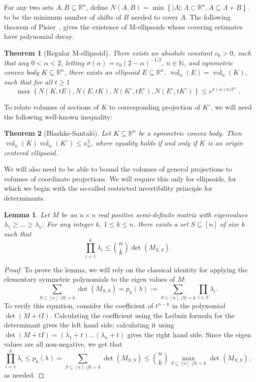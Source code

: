 \documentclass{article}
\newtheorem{theorem}{Theorem}
\newtheorem{lemma}{Lemma}
\newcommand{\R}{{\mathbb{R}}}
\newcommand{\N}{{\mathbb{N}}}
\newcommand{\set}[1]{\left\{ #1 \right\}}
\DeclareMathOperator{\vol}{vol}
\begin{document}
For any two sets $A,B \subseteq \R^n$, define $N(A,B) = \min \set{|\Lambda|:
\Lambda \subset \R^n, A \subseteq \Lambda+B}$.  to be the minimum number of
shifts of $B$ needed to cover $A$. The following theorem of
Pisier~\cite{Pisier-book}, gives the existence of M-ellipsoids whose covering
estimates have polynomial decay. 

\begin{theorem}[Regular M-ellipsoid]
There exists an absolute constant $c_0 > 0$, such that any $0 < \alpha < 2$,
letting $\sigma(\alpha) = c_0(2-\alpha)^{-1/2}$, $n \in \N$, and symmetric
convex body $K \subseteq \R^n$, there exists an ellipsoid $E \subseteq \R^n$,
$\vol_n(E)=\vol_n(K)$, such that for all $t \geq 1$
\[
\max \set{N(K,tE),N(E,tK),N(K^\circ,tE^\circ),N(E^\circ,tK^\circ)} \leq
e^{\sigma(\alpha) n / t^\alpha} \text{ .}
\]
\end{theorem}

To relate volumes of sections of $K$ to corresponding projection of $K^\circ$,
we will need the following well-known inequality:

\begin{theorem}[Blashke-Santal{\'o}]\label{thm:santalo} 
Let $K \subseteq \R^n$ be a symmetric convex body. Then $\vol_n(K)
\vol_n(K^\circ) \leq \kappa_n^2$, where equality holds if and only if $K$ is
an origin centered ellipsoid. 
\end{theorem}

We will also need to be able to bound the volumes of general projections to
volumes of coordinate projections. We will require this only for ellipsoids, for
which we begin with the so-called restricted invertibility principle for
determinants. 

\begin{lemma}\label{lm:rip-det}
  Let $M$ be an $n\times n$ real positive semi-definite matrix with
  eigenvalues $\lambda_1 \ge \ldots \ge \lambda_n$. For any integer
  $k$, $1 \le k \le n$, there exists a set $S \subseteq [n]$ of size $k$
  such that
  \[\prod_{i=1}^k \lambda_i \leq \binom{n}{k} \det(M_{S,S}).\]
\end{lemma}
\begin{proof}
To prove the lemma, we will rely on the classical identity for applying the
elementary symmetric polynomials to the eigen values of $M$:
\begin{equation*}
 \sum_{S \subset [n]: |S| = k}\det(M_{S,S}) = p_k(\lambda) := 
\sum_{S \in [n],|S|=k} \prod_{i \in S} \lambda_i.
\end{equation*}
To verify this equation, consider the coefficient of $t^{n-k}$ in the polynomial
$\det(M + tI)$. Calculating the coefficient using the Leibniz formula for the
determinant gives the left hand side; calculating it using $\det(M + tI) =
(\lambda_1 + t)\ldots(\lambda_n + t)$ gives the right hand side. Since the eigen
values are all non-negative, we get that
\[
\prod_{i=1}^k \lambda_i \leq p_k(\lambda) =  
 \sum_{S \subseteq [n]: |S|=k} \det(M_{S,S}) \leq \binom{n}{k} \max_{S
\subseteq [n]: |S|=k} \det(M_{S,S}),
\]
as needed.
\end{proof}
\end{document}
